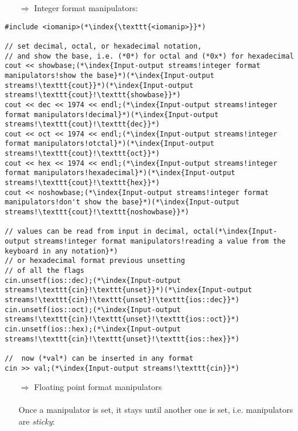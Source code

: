 \documentclass[10pt]{article}
\begin{document}
\begin{enumerate}
\item[$\Rightarrow$] Integer format manipulators:
\end{enumerate}
\begin{lstlisting}
#include <iomanip>(*\index{\texttt{<iomanip>}}*)

// set decimal, octal, or hexadecimal notation,
// and show the base, i.e. (*0*) for octal and (*0x*) for hexadecimal
cout << showbase;(*\index{Input-output streams!integer format manipulators!show the base}*)(*\index{Input-output streams!\texttt{cout}}*)(*\index{Input-output streams!\texttt{cout}!\texttt{showbase}}*)
cout << dec << 1974 << endl;(*\index{Input-output streams!integer format manipulators!decimal}*)(*\index{Input-output streams!\texttt{cout}!\texttt{dec}}*)
cout << oct << 1974 << endl;(*\index{Input-output streams!integer format manipulators!otctal}*)(*\index{Input-output streams!\texttt{cout}!\texttt{oct}}*)
cout << hex << 1974 << endl;(*\index{Input-output streams!integer format manipulators!hexadecimal}*)(*\index{Input-output streams!\texttt{cout}!\texttt{hex}}*)
cout << noshowbase;(*\index{Input-output streams!integer format manipulators!don't show the base}*)(*\index{Input-output streams!\texttt{cout}!\texttt{noshowbase}}*)

// values can be read from input in decimal, octal(*\index{Input-output streams!integer format manipulators!reading a value from the keyboard in any notation}*)
// or hexadecimal format previous unsetting
// of all the flags
cin.unsetf(ios::dec);(*\index{Input-output streams!\texttt{cin}!\texttt{unset}}*)(*\index{Input-output streams!\texttt{cin}!\texttt{unset}!\texttt{ios::dec}}*)
cin.unsetf(ios::oct);(*\index{Input-output streams!\texttt{cin}!\texttt{unset}!\texttt{ios::oct}}*)
cin.unsetf(ios::hex);(*\index{Input-output streams!\texttt{cin}!\texttt{unset}!\texttt{ios::hex}}*)

//  now (*val*) can be inserted in any format
cin >> val;(*\index{Input-output streams!\texttt{cin}}*)
\end{lstlisting}
\begin{enumerate}
\item[$\Rightarrow$] Floating point format manipulators\\ \\ Once a  manipulator is set, it stays until another one is set, i.e. manipulators are \emph{sticky}:
\end{enumerate}
\end{document}

